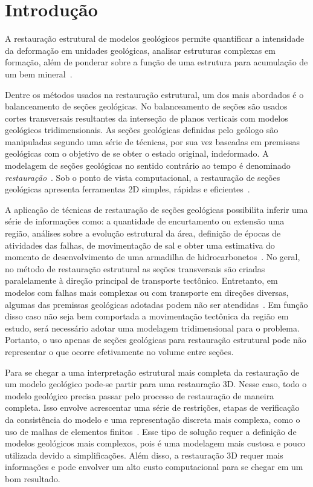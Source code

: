 
\chapter{Introdução}

A restauração estrutural de modelos geológicos permite quantificar a intensidade da deformação em unidades geológicas, analisar estruturas complexas em formação, além de ponderar sobre a função de uma estrutura para acumulação de um bem mineral~\cite{GarciaTese}.

Dentre os métodos usados na restauração estrutural, um dos mais abordados é o balanceamento de seções geológicas. No balanceamento de seções são usados cortes transversais resultantes da interseção de planos verticais com modelos geológicos tridimensionais. As seções geológicas definidas pelo geólogo são manipuladas segundo uma série de técnicas, por sua vez baseadas em premissas geológicas com o objetivo de se obter o estado original, indeformado. A modelagem de seções geológicas no sentido contrário ao tempo é denominado \emph{restauração}~\cite{Fossen}. Sob o ponto de vista computacional, a restauração de seções geológicas apresenta ferramentas 2D simples, rápidas e eficientes~\cite{GarciaTese}.

A aplicação de técnicas de restauração de seções geológicas possibilita inferir uma série de informações como: a quantidade de encurtamento ou extensão uma região, análises sobre a evolução estrutural da área, definição de épocas de atividades das falhas, de movimentação de sal e obter uma estimativa do momento de desenvolvimento de uma armadilha de hidrocarbonetos~\cite{DURANDRIARD-3D, Guedes}. No geral, no método de restauração estrutural as seções transversais são criadas paralelamente à direção principal de transporte tectônico. Entretanto, em modelos com falhas mais complexas ou com transporte em direções diversas, algumas das premissas geológicas adotadas podem não ser atendidas~\cite{GarciaTese}. Em função disso caso não seja bem comportada a movimentação tectônica da região em estudo, será necessário adotar uma modelagem tridimensional para o problema. Portanto, o uso apenas de seções geológicas para restauração estrutural pode não representar o que ocorre efetivamente no volume entre seções.

Para se chegar a uma interpretação estrutural mais completa da restauração de um modelo geológico pode-se partir para uma restauração 3D. Nesse caso, todo o modelo geológico precisa passar pelo processo de restauração de maneira completa. Isso envolve acrescentar uma série de restrições, etapas de verificação da consistência do modelo e uma representação discreta mais complexa, como o uso de malhas de elementos finitos~\cite{DURANDRIARD2010441}. Esse tipo de solução requer a definição de modelos geológicos mais complexos, pois é uma modelagem mais custosa e pouco utilizada devido a simplificações. Além disso, a restauração 3D requer mais informações e pode envolver um alto custo computacional para se chegar em um bom resultado.

